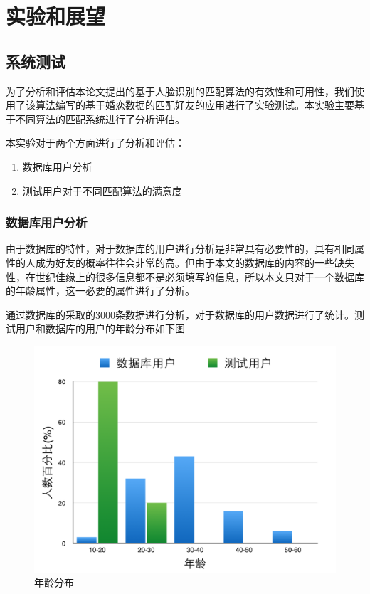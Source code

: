 
\chapter{实验和展望}
\section{系统测试}
为了分析和评估本论文提出的基于人脸识别的匹配算法的有效性和可用性，我们使用了该算法编写的基于婚恋数据的匹配好友的应用进行了实验测试。本实验主要基于不同算法的匹配系统进行了分析评估。

本实验对于两个方面进行了分析和评估：
\begin{enumerate}
\item 数据库用户分析
\item 测试用户对于不同匹配算法的满意度
\end{enumerate}

\subsection{数据库用户分析}
由于数据库的特性，对于数据库的用户进行分析是非常具有必要性的，具有相同属性的人成为好友的概率往往会非常的高。但由于本文的数据库的内容的一些缺失性，在世纪佳缘上的很多信息都不是必须填写的信息，所以本文只对于一个数据库的年龄属性，这一必要的属性进行了分析。

通过数据库的采取的3000条数据进行分析，对于数据库的用户数据进行了统计。测试用户和数据库的用户的年龄分布如下图
\begin{figure}[h] 
\begin{minipage}[t]{\linewidth}

\centering

\includegraphics[width=\textwidth]{img/chap5/exp1.png}
\caption{年龄分布\label{instagram}}
\end{minipage}
\end{figure}

